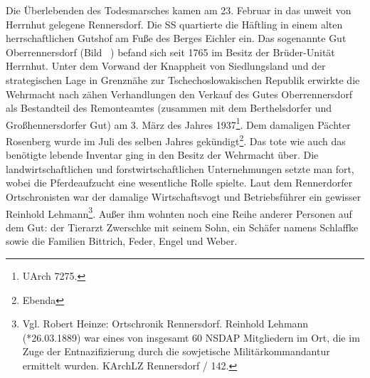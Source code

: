 

Die Überlebenden des Todesmarsches kamen am 23. Februar in das unweit von Herrnhut gelegene Rennersdorf. Die SS quartierte die Häftling in einem alten herrschaftlichen Gutshof am Fuße des Berges Eichler ein.
Das sogenannte Gut Oberrennersdorf (Bild ~) befand sich seit 1765 im Besitz der Brüder-Unität Herrnhut.
Unter dem Vorwand der Knappheit von Siedlungsland und der strategischen Lage in Grenz\-nähe zur Tschechoslowakischen Republik erwirkte die Wehrmacht nach zähen Verhandlungen den Verkauf des Gutes Oberrennersdorf als Bestandteil des Remonteamtes (zusammen mit dem Berthelsdorfer und Großhennersdorfer Gut) am 3. März des Jahres 1937\footnote{UArch 7275.}. Dem damaligen Pächter Rosenberg wurde im Juli des selben Jahres gekündigt\footnote{Ebenda}. 
Das tote wie auch das benötigte lebende Inventar ging in den Besitz der Wehrmacht über. Die landwirtschaftlichen und forstwirtschaftlichen Unternehmungen setzte man fort, wobei die Pferdeaufzucht eine wesentliche Rolle spielte. 
Laut dem Rennerdorfer Ortschronisten war der damalige Wirtschaftsvogt und Betriebsführer ein gewisser Reinhold Lehmann\footnote{Vgl. Robert Heinze: Ortschronik Rennersdorf. Reinhold Lehmann (*26.03.1889) war eines von insgesamt 60 NSDAP Mitgliedern im Ort, die im Zuge der Entnazifizierung durch die sowjetische Militärkommandantur ermittelt wurden. KArchLZ Rennersdorf / 142. }. Außer ihm wohnten noch eine Reihe anderer Personen auf dem Gut: der Tierarzt Zwerschke mit seinem Sohn, ein Schäfer namens Schlaffke sowie die Familien Bittrich, Feder, Engel und Weber. 

